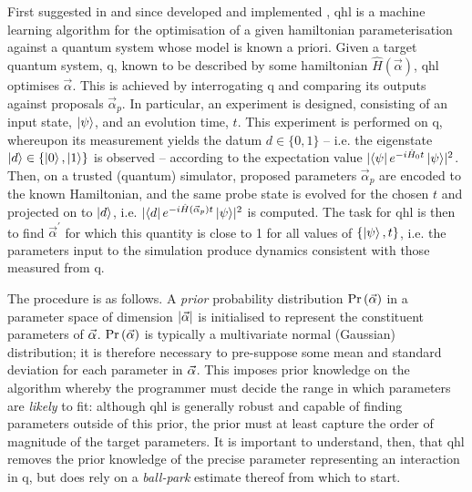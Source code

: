 
First suggested in \cite{Granade:2012kj} and since developed \cite{wiebe2014qhlpra, Wiebe:2014qhl} 
and implemented \cite{wang2017experimental}, 
\gls{qhl} is a machine learning algorithm for the optimisation of a given \gls{hamiltonian} parameterisation 
against a quantum system whose model is known a priori. 
Given a target quantum system, \gls{q}, known to be described by some \gls{hamiltonian} $\hat{H}(\vec{\alpha})$, 
\gls{qhl} optimises $\vec{\alpha}$.
This is achieved by interrogating \gls{q} and comparing its outputs against proposals $\vec{\alpha}_p$. 
In particular, an \gls{experiment} is designed, consisting of an input state, $\ket{\psi}$, and an evolution time, $t$.
This \gls{experiment} is performed on \gls{q}, whereupon its measurement yields the datum $d \in \{0, 1\}$ -- 
i.e. the eigenstate $\ket{d} \in \{ \ket{0}, \ket{1}\}$ is observed -- 
according to the \gls{expectation value} $\lvert \bra{\psi} e^{-i \hat{H}_0 t} \ket{\psi} \rvert^2$. 
Then, on a trusted (quantum) simulator, proposed parameters $\vec{\alpha}_p$ are encoded to the 
known Hamiltonian, and the same \gls{probe} state is evolved for the chosen $t$ and projected on to $\ket{d}$, 
i.e. $\lvert \bra{d} e^{-i \hat{H}(\vec{\alpha}_p) t } \ket{\psi} \rvert^2 $ is computed.
The task for \gls{qhl} is then to find $\vec{\alpha}^{\prime}$ for which this quantity 
is close to 1 for all values of $\{\ket{\psi}, t\}$, 
i.e. the parameters input to the simulation produce dynamics consistent with those measured from \gls{q}.

\par 

The procedure is as follows. 
A \emph{prior} probability distribution $\Pr\left(\vec{\alpha}\right)$ in a parameter space of dimension $\lvert \vec{\alpha} \rvert$ 
is initialised to represent the constituent parameters of $\vec{\alpha}$. 
$\Pr\left(\vec{\alpha}\right)$ is typically a multivariate normal (Gaussian) distribution; 
it is therefore necessary to pre-suppose some mean and standard deviation for each parameter in $\vec{\alpha}$. 
This imposes prior knowledge on the algorithm whereby the programmer must decide the range in 
which parameters are \emph{likely} to fit:
although \gls{qhl} is generally robust and capable of finding parameters outside of this prior,
the prior must at least capture the order of magnitude of the target parameters. 
It is important to understand, then, that \gls{qhl} removes the prior knowledge 
of the precise parameter representing an interaction in \gls{q}, but does rely on a \emph{ball-park} estimate thereof from which to start. 
\par 

